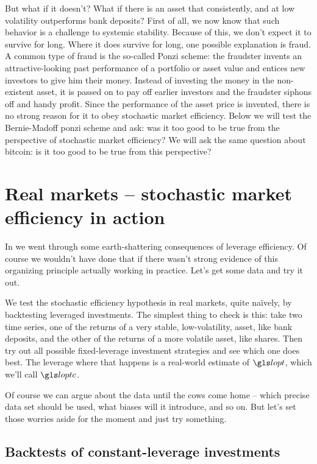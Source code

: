But what if it doesn't? What if there is an asset that consistently, and at low volatility outperforms bank deposits? 
First of all, we now know that such behavior is a challenge to systemic stability. Because of this, we don't expect it to survive for long. Where it does survive for long, one possible explanation is fraud. A common type of fraud is the so-called Ponzi scheme: the fraudster invents an attractive-looking past performance of a portfolio or asset value and entices new investors to give him their money. Instead of investing the money in the non-existent asset, it is passed on to pay off earlier investors and the fraudster siphons off and handy profit. Since the performance of the asset price is invented, there is no strong reason for it to obey stochastic market efficiency. Below we will test the Bernie-Madoff ponzi scheme and ask: was it too good to be true from the perspective of stochastic market efficiency? We will ask the same question about bitcoin: is it too good to be true from this perspective?

\section{Real markets -- stochastic market efficiency in action}
In  we went through some earth-shattering consequences of leverage efficiency. Of course we wouldn't have done that if there wasn't strong evidence of this organizing principle actually working in practice. Let's get some data and try it out. 

We test the stochastic efficiency hypothesis in real markets, quite na\"ively, by backtesting leveraged investments. The simplest thing to check is this: take two time series, one of the returns of a very stable, low-volatility, asset, like bank deposits, and the other of the returns of a more volatile asset, like shares. Then try out all possible fixed-leverage investment strategies and see which one does best. The leverage where that happens is a real-world estimate of $\lopt$, which we'll call $\loptc$.

Of course we can argue about the data until the cows come home -- which precise data set should be used, what biases will it introduce, and so on. But let's set those worries aside for the moment and just try something.


\subsection{Backtests of constant-leverage investments}

